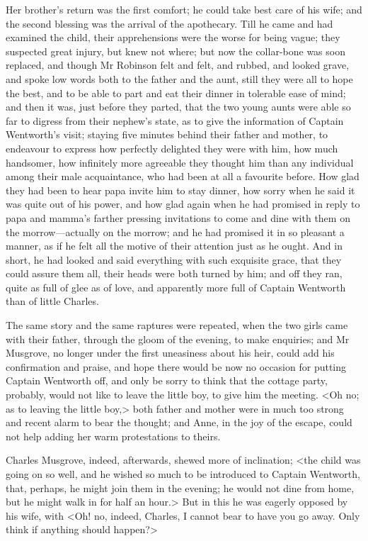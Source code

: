 Her brother's return was the first comfort; he could take best care of his wife; and the second blessing was the arrival of the apothecary. Till he came and had examined the child, their apprehensions were the worse for being vague; they suspected great injury, but knew not where; but now the collar-bone was soon replaced, and though Mr Robinson felt and felt, and rubbed, and looked grave, and spoke low words both to the father and the aunt, still they were all to hope the best, and to be able to part and eat their dinner in tolerable ease of mind; and then it was, just before they parted, that the two young aunts were able so far to digress from their nephew's state, as to give the information of Captain Wentworth's visit; staying five minutes behind their father and mother, to endeavour to express how perfectly delighted they were with him, how much handsomer, how infinitely more agreeable they thought him than any individual among their male acquaintance, who had been at all a favourite before. How glad they had been to hear papa invite him to stay dinner, how sorry when he said it was quite out of his power, and how glad again when he had promised in reply to papa and mamma's farther pressing invitations to come and dine with them on the morrow—actually on the morrow; and he had promised it in so pleasant a manner, as if he felt all the motive of their attention just as he ought. And in short, he had looked and said everything with such exquisite grace, that they could assure them all, their heads were both turned by him; and off they ran, quite as full of glee as of love, and apparently more full of Captain Wentworth than of little Charles.

The same story and the same raptures were repeated, when the two girls came with their father, through the gloom of the evening, to make enquiries; and Mr Musgrove, no longer under the first uneasiness about his heir, could add his confirmation and praise, and hope there would be now no occasion for putting Captain Wentworth off, and only be sorry to think that the cottage party, probably, would not like to leave the little boy, to give him the meeting. <Oh no; as to leaving the little boy,> both father and mother were in much too strong and recent alarm to bear the thought; and Anne, in the joy of the escape, could not help adding her warm protestations to theirs.

Charles Musgrove, indeed, afterwards, shewed more of inclination; <the child was going on so well, and he wished so much to be introduced to Captain Wentworth, that, perhaps, he might join them in the evening; he would not dine from home, but he might walk in for half an hour.> But in this he was eagerly opposed by his wife, with <Oh! no, indeed, Charles, I cannot bear to have you go away. Only think if anything should happen?>

